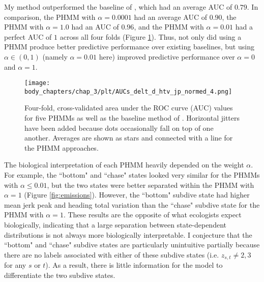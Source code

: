 My method outperformed the baseline of \cite{Tennessen:2019a}, which had an average AUC of $0.79$. In comparison, the PHMM with $\alpha = 0.0001$ had an average AUC of $0.90$, the PHMM with $\alpha = 1.0$ had an AUC of $0.96$, and the PHMM with $\alpha = 0.01$ had a perfect AUC of $1$ across all four folds (Figure \ref{fig:AUCs_cs2}). Thus, not only did using a PHMM produce better predictive performance over existing baselines, but using $\alpha \in (0,1)$ (namely $\alpha = 0.01$ here) improved predictive performance over $\alpha = 0$ and $\alpha = 1$.

\begin{figure}
    \centering
    \texttt{[image: body\_chapters/chap\_3/plt/AUCs\_delt\_d\_htv\_jp\_normed\_4.png]}
    \caption[Four-fold, cross-validated area under the ROC curve (AUC) values for five PHMMs as well as the baseline method of \citet{Tennessen:2019a}.]{Four-fold, cross-validated area under the ROC curve (AUC) values for five PHMMs as well as the baseline method of \citet{Tennessen:2019a}. Horizontal jitters have been added because dots occasionally fall on top of one another. Averages are shown as stars and connected with a line for the PHMM approaches.}
    \label{fig:AUCs_cs2}
\end{figure}

The biological interpretation of each PHMM heavily depended on the weight $\alpha$. For example, the ``bottom" and ``chase" states looked very similar for the PHMMs with $\alpha \leq 0.01$, but the two states were better separated within the PHMM with $\alpha = 1$ (Figure \ref{fig:emissions}). %
However, the ``bottom" subdive state had higher mean jerk peak and heading total variation than the ``chase" subdive state for the PHMM with $\alpha = 1$. These results are the opposite of what ecologists expect biologically, indicating that a large separation between state-dependent distributions is not always more biologically interpretable. I conjecture that the ``bottom" and ``chase" subdive states are particularly unintuitive partially because there are no labels associated with either of these subdive states (i.e. $z_{s,t} \neq 2,3$ for any $s$ or $t$). As a result, there is little information for the model to differentiate the two subdive states. 

